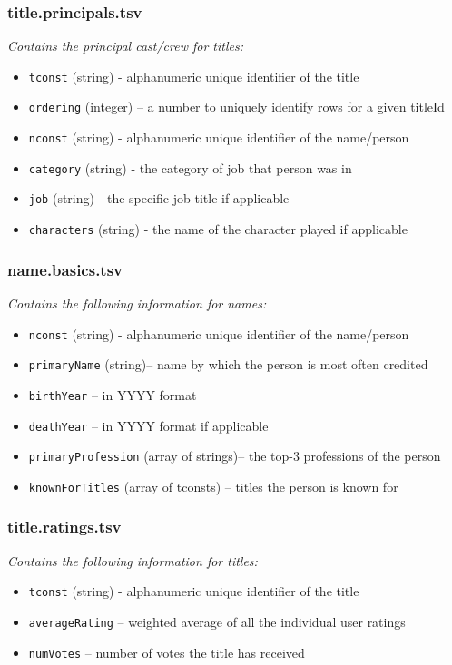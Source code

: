 \subsubsection*{title.principals.tsv}
\emph{Contains the principal cast/crew for titles:}
\begin{itemize}
    \item \texttt{tconst} (string) - alphanumeric unique identifier of the title
    \item \texttt{ordering} (integer) – a number to uniquely identify rows for a given titleId
    \item \texttt{nconst} (string) - alphanumeric unique identifier of the name/person
    \item \texttt{category} (string) - the category of job that person was in
    \item \texttt{job} (string) - the specific job title if applicable
    \item \texttt{characters} (string) - the name of the character played if applicable
\end{itemize}

\subsubsection*{name.basics.tsv}
\emph{Contains the following information for names:}
\begin{itemize}
    \item \texttt{nconst} (string) - alphanumeric unique identifier of the name/person
    \item \texttt{primaryName} (string)– name by which the person is most often credited
    \item \texttt{birthYear} – in YYYY format
    \item \texttt{deathYear} – in YYYY format if applicable
    \item \texttt{primaryProfession} (array of strings)– the top-3 professions of the person
    \item \texttt{knownForTitles} (array of tconsts) – titles the person is known for
\end{itemize}

\subsubsection*{title.ratings.tsv}
\emph{Contains the following information for titles:}
\begin{itemize}
    \item \texttt{tconst} (string) - alphanumeric unique identifier of the title
    \item \texttt{averageRating} – weighted average of all the individual user ratings
    \item \texttt{numVotes} – number of votes the title has received
\end{itemize}

